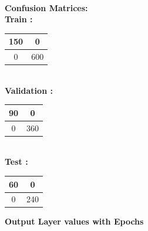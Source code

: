 \documentclass{article}
\begin{document}
\begin{flushleft}
\textbf{\\[5pt]Confusion Matrices: \\[10pt]}
\textbf{Train :\\[5pt]}
\begin{tabular}{|c|c|}\hline  150 & 0 \\ \hline 0 & 600 \\ \hline \end{tabular}

\textbf{\\[10pt]Validation :\\[5pt]}

\begin{tabular}{|c|c|}\hline  90 & 0 \\ \hline 0 & 360 \\ \hline \end{tabular}

\textbf{\\[10pt]Test :\\[5pt]}


\begin{tabular}{|c|c|}\hline  60 & 0 \\ \hline 0 & 240 \\ \hline \end{tabular}
\end{flushleft}
\newpage
\textbf{Output Layer values with Epochs\\[5pt]}
\end{document}
